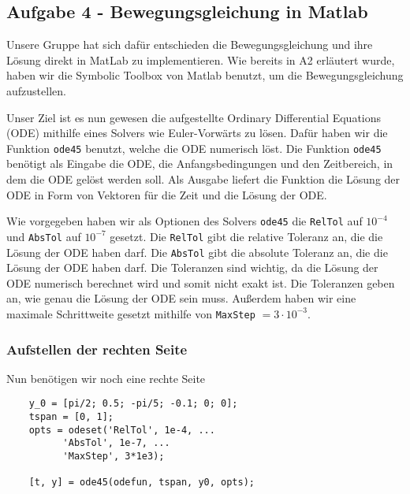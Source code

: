 \subsection*{Aufgabe 4 - Bewegungsgleichung in Matlab}

Unsere Gruppe hat sich dafür entschieden die Bewegungsgleichung und ihre Lösung direkt in MatLab zu implementieren. Wie bereits in A2 erläutert wurde, haben wir die Symbolic Toolbox von Matlab benutzt, um die Bewegungsgleichung aufzustellen.

Unser Ziel ist es nun gewesen die aufgestellte Ordinary Differential Equations (ODE) mithilfe eines Solvers wie Euler-Vorwärts zu lösen. Dafür haben wir die Funktion \texttt{ode45} benutzt, welche die ODE numerisch löst. Die Funktion \texttt{ode45} benötigt als Eingabe die ODE, die Anfangsbedingungen und den Zeitbereich, in dem die ODE gelöst werden soll. Als Ausgabe liefert die Funktion die Lösung der ODE in Form von Vektoren für die Zeit und die Lösung der ODE. 

Wie vorgegeben haben wir als Optionen des Solvers \texttt{ode45} die \texttt{RelTol} auf $10^{-4}$ und \texttt{AbsTol} auf $10^{-7}$ gesetzt. Die \texttt{RelTol} gibt die relative Toleranz an, die die Lösung der ODE haben darf. Die \texttt{AbsTol} gibt die absolute Toleranz an, die die Lösung der ODE haben darf. Die Toleranzen sind wichtig, da die Lösung der ODE numerisch berechnet wird und somit nicht exakt ist. Die Toleranzen geben an, wie genau die Lösung der ODE sein muss. Außerdem haben wir eine maximale Schrittweite gesetzt mithilfe von \texttt{MaxStep} $=3\cdot 10^{-3}$. 

\subsubsection[short]{Aufstellen der rechten Seite}

Nun benötigen wir noch eine rechte Seite

\begin{lstlisting}[caption={Aufruf der Funktion \texttt{ode45}},label={lst:ode45}]
    % Syntax: y_0 = [alpha; alpha_dot; beta; beta_dot, err_alpha, err_beta]
    y_0 = [pi/2; 0.5; -pi/5; -0.1; 0; 0];
    tspan = [0, 1];
    opts = odeset('RelTol', 1e-4, ...
          'AbsTol', 1e-7, ...
          'MaxStep', 3*1e3);
    
    [t, y] = ode45(odefun, tspan, y0, opts);
\end{lstlisting}


